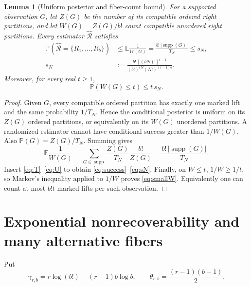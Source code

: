 \documentclass[11pt]{article}
\newtheorem{lemma}{Lemma}
\newcommand{\Prob}{\mathbb P}
\newcommand{\E}{\mathbb E}
\begin{document}
\begin{lemma}[Uniform posterior and fiber-count bound]\label{lem:count}
For a supported observation $G$, let $Z(G)$ be the number of its
compatible \emph{ordered} right partitions, and let
$W(G)=Z(G)/b!$ count compatible unordered right partitions.
Every estimator $\widehat{\mathcal R}$ satisfies
\begin{align}
 \Prob(\widehat{\mathcal R}=\{R_1,\ldots,R_b\})
 &\le\E\frac1{W(G)}
 =\frac{b!\,|\operatorname{supp}(G)|}{T_N}
 \le s_N,\label{eq:success}\\
 s_N&:=\frac{b!\,[(bN)!]^{r-1}}
              {(b!)^{rN}(N!)^{(r-1)b}}.\label{eq:sN}
\end{align}
Moreover, for every real $t\ge1$,
\begin{equation}\label{eq:smallW}
 \Prob(W(G)\le t)\le t\,s_N.
\end{equation}
\end{lemma}
\begin{proof}
Given $G$, every compatible ordered partition has exactly one marked
lift and the same probability $1/T_N$. Hence the conditional posterior
is uniform on its $Z(G)$ ordered partitions, or equivalently on
its $W(G)$ unordered partitions. A randomized estimator cannot have
conditional success greater than $1/W(G)$. Also
$\Prob(G)=Z(G)/T_N$. Summing gives
\[
 \E\frac1{W(G)}
 =\sum_{G\in\operatorname{supp}}
      \frac{Z(G)}{T_N}\frac{b!}{Z(G)}
 =\frac{b!\,|\operatorname{supp}(G)|}{T_N}.
\]
Insert \eqref{eq:T}--\eqref{eq:U} to obtain
\eqref{eq:success}--\eqref{eq:sN}. Finally, on $W\le t$,
$1/W\ge1/t$, so Markov's inequality applied to $1/W$ proves
\eqref{eq:smallW}. Equivalently one can count at most $b!t$
marked lifts per such observation.
\end{proof}

\section{Exponential nonrecoverability and many alternative fibers}
Put
\[
 \gamma_{r,b}=r\log(b!)-(r-1)b\log b,
 \qquad \theta_{r,b}=\frac{(r-1)(b-1)}2.
\]
\end{document}
